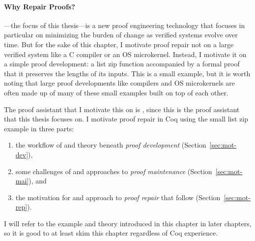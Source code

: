 \paragraph{Why Repair Proofs?}

---the focus of this thesis---is a new proof engineering technology that focuses in particular on minimizing the burden of change as verified systems evolve over time.
But for the sake of this chapter, I motivate proof repair not on a large verified system like a C compiler or an OS microkernel.
Instead, I motivate it on a simple proof development: a list zip function accompanied by a formal proof that it preserves the lengths of its inputs.
This is a small example, but it is worth noting that large proof developments like compilers and OS microkernels
are often made up of many of these small examples built on top of each other.

The proof assistant that I motivate this on is , since this is the proof assistant that this thesis focuses on.
I motivate proof repair in Coq using the small list zip example in three parts:

\begin{enumerate}
\item the workflow of and theory beneath \textit{proof development} (Section~\ref{sec:mot-dev}),
\item some challenges of and approaches to \textit{proof maintenance} (Section~\ref{sec:mot-mai}), and
\item the motivation for and approach to \textit{proof repair} that follow (Section~\ref{sec:mot-rep}).
\end{enumerate}
I will refer to the example and theory introduced in this chapter in later chapters, so it is good to at least skim this chapter regardless of Coq experience.









